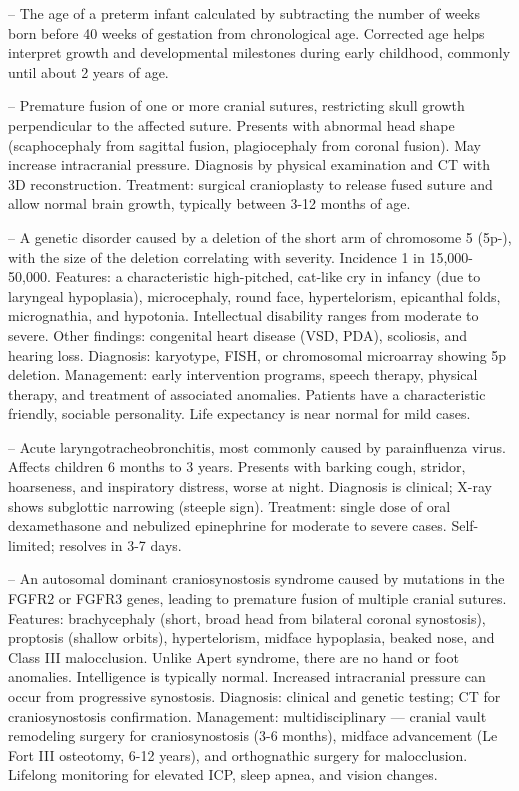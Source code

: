-- The age of a preterm infant calculated by subtracting the number of weeks born before 40 weeks of gestation from chronological age. Corrected age helps interpret growth and developmental milestones during early childhood, commonly until about 2 years of age.

-- Premature fusion of one or more cranial sutures, restricting skull growth perpendicular to the affected suture. Presents with abnormal head shape (scaphocephaly from sagittal fusion, plagiocephaly from coronal fusion). May increase intracranial pressure. Diagnosis by physical examination and CT with 3D reconstruction. Treatment: surgical cranioplasty to release fused suture and allow normal brain growth, typically between 3-12 months of age.

-- A genetic disorder caused by a deletion of the short arm of chromosome 5 (5p-), with the size of the deletion correlating with severity. Incidence 1 in 15,000-50,000. Features: a characteristic high-pitched, cat-like cry in infancy (due to laryngeal hypoplasia), microcephaly, round face, hypertelorism, epicanthal folds, micrognathia, and hypotonia. Intellectual disability ranges from moderate to severe. Other findings: congenital heart disease (VSD, PDA), scoliosis, and hearing loss. Diagnosis: karyotype, FISH, or chromosomal microarray showing 5p deletion. Management: early intervention programs, speech therapy, physical therapy, and treatment of associated anomalies. Patients have a characteristic friendly, sociable personality. Life expectancy is near normal for mild cases.

-- Acute laryngotracheobronchitis, most commonly caused by parainfluenza virus. Affects children 6 months to 3 years. Presents with barking cough, stridor, hoarseness, and inspiratory distress, worse at night. Diagnosis is clinical; X-ray shows subglottic narrowing (steeple sign). Treatment: single dose of oral dexamethasone and nebulized epinephrine for moderate to severe cases. Self-limited; resolves in 3-7 days.

-- An autosomal dominant craniosynostosis syndrome caused by mutations in the FGFR2 or FGFR3 genes, leading to premature fusion of multiple cranial sutures. Features: brachycephaly (short, broad head from bilateral coronal synostosis), proptosis (shallow orbits), hypertelorism, midface hypoplasia, beaked nose, and Class III malocclusion. Unlike Apert syndrome, there are no hand or foot anomalies. Intelligence is typically normal. Increased intracranial pressure can occur from progressive synostosis. Diagnosis: clinical and genetic testing; CT for craniosynostosis confirmation. Management: multidisciplinary — cranial vault remodeling surgery for craniosynostosis (3-6 months), midface advancement (Le Fort III osteotomy, 6-12 years), and orthognathic surgery for malocclusion. Lifelong monitoring for elevated ICP, sleep apnea, and vision changes.

